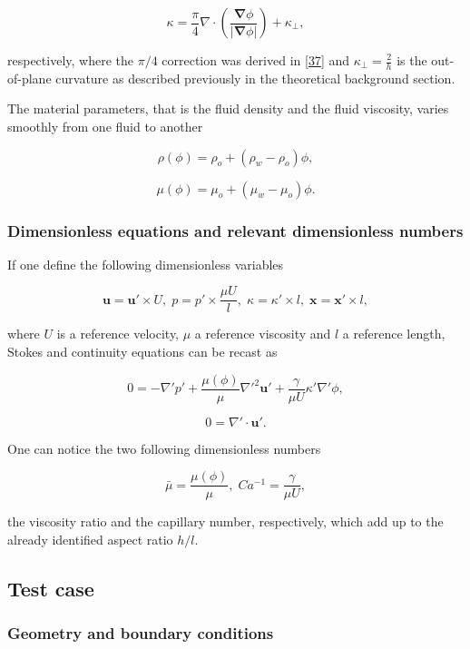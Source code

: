 \documentclass[]{article}
\begin{document}
\[
\kappa=\frac{\pi}{4}\nabla\cdot\left(\frac{\boldsymbol{\nabla}\phi}{\vert\boldsymbol{\nabla}\phi\vert}\right)+\kappa_{\perp},
\]

respectively, where the \(\pi/4\) correction was derived in
{[}\protect\hyperlink{ref-park1984two}{37}{]} and
\(\kappa_{\perp}=\frac{2}{h}\) is the out-of-plane curvature as
described previously in the theoretical background section.

The material parameters, that is the fluid density and the fluid
viscosity, varies smoothly from one fluid to another

\[
\rho(\phi)=\rho_{o}+(\rho_{w}-\rho_{o})\phi,
\]

\[
\mu(\phi)=\mu_{o}+(\mu_{w}-\mu_{o})\phi.
\]

\hypertarget{dimensionless-equations-and-relevant-dimensionless-numbers}{%
\subsubsection{Dimensionless equations and relevant dimensionless
numbers}\label{dimensionless-equations-and-relevant-dimensionless-numbers}}

If one define the following dimensionless variables

\[
\mathbf{u}=\mathbf{u}'\times U,\;p=p'\times\frac{\mu U}{l},\;\kappa=\kappa'\times l,\;\mathbf{x}=\mathbf{x}'\times l,
\]

where \(U\) is a reference velocity, \(\mu\) a reference viscosity and
\(l\) a reference length, Stokes and continuity equations can be recast
as

\[
0=-\nabla'p'+\frac{\mu(\phi)}{\mu}\nabla'^{2}\mathbf{u}'+\frac{\gamma}{\mu U}\kappa'\nabla'\phi,
\]

\[
0=\nabla'\cdot\mathbf{u}'.
\]

One can notice the two following dimensionless numbers

\[
\bar{\mu}=\frac{\mu(\phi)}{\mu},\;Ca^{-1}=\frac{\gamma}{\mu U},
\]

the viscosity ratio and the capillary number, respectively, which add up
to the already identified aspect ratio \(h/l\).

\hypertarget{test-case}{%
\subsection{Test case}\label{test-case}}

\hypertarget{geometry-and-boundary-conditions}{%
\subsubsection{Geometry and boundary
conditions}\label{geometry-and-boundary-conditions}}
\end{document}
